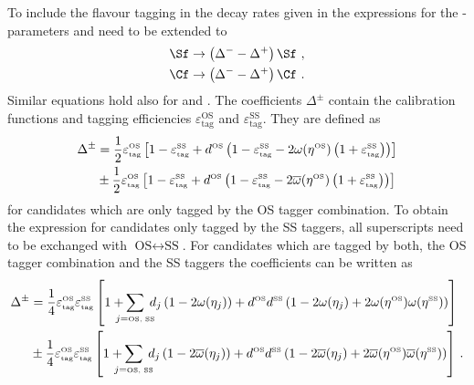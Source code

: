 To include the flavour tagging in the decay rates given in  the expressions for the \CP-parameters \Sf and \Cf need to be extended to
\begin{equation}
\begin{aligned}
\Sf&\to\left(\Delta^--\Delta^+\right)\Sf\,\,,\\
\Cf&\to\left(\Delta^--\Delta^+\right)\Cf\,\,.\label{eq:decRateCorrectFT}
\end{aligned}
\end{equation}
Similar equations hold also for \Sfbar and \Cfbar.
The coefficients $\Delta^\pm$ contain the calibration functions and tagging efficiencies $\varepsilon_{\text{tag}}^{\text{OS}}$ and $\varepsilon_{\text{tag}}^{\text{SS}}$.
They are defined as
\begin{align}
\Delta^\pm&=\frac{1}{2}\varepsilon_{\text{\tiny tag}}^{\text{\tiny OS}}\left[1-\varepsilon_{\text{\tiny tag}}^{\text{\tiny SS}}+d^{\text{\tiny OS}}\left(1-\varepsilon_{\text{\tiny tag}}^{\text{\tiny SS}}-2\omega(\eta^{\text{\tiny OS}})\left(1+\varepsilon_{\text{\tiny tag}}^{\text{\tiny SS}}\right)\right)\right]\nonumber\\
&\pm\frac{1}{2}\varepsilon_{\text{\tiny tag}}^{\text{\tiny OS}}\left[1-\varepsilon_{\text{\tiny tag}}^{\text{\tiny SS}}+d^{\text{\tiny OS}}\left(1-\varepsilon_{\text{\tiny tag}}^{\text{\tiny SS}}-2\overline{\omega}(\eta^{\text{\tiny OS}})\left(1+\varepsilon_{\text{\tiny tag}}^{\text{\tiny SS}}\right)\right)\right]
\end{align}
for candidates which are only tagged by the OS tagger combination.
To obtain the expression for candidates only tagged by the SS taggers, all superscripts need to be exchanged with $\text{OS}\leftrightarrow\text{SS}$.
For candidates which are tagged by both, the OS tagger combination and the SS taggers the coefficients can be written as
\begin{align}
\Delta^\pm&=\frac{1}{4}\varepsilon_{\text{\tiny tag}}^{\text{\tiny OS}}\varepsilon_{\text{\tiny tag}}^{\text{\tiny SS}}\left[1+\hspace{-3mm}\sum_{j=\text{\tiny OS, SS}}\hspace{-2mm}d_j\left(1-2\omega(\eta_j)\right)+d^{\text{\tiny OS}}d^{\text{\tiny SS}}\left(1-2\omega(\eta_j)+2\omega(\eta^{\text{\tiny OS}})\omega(\eta^{\text{\tiny SS}})\right)\right]\nonumber\\
&\pm\frac{1}{4}\varepsilon_{\text{\tiny tag}}^{\text{\tiny OS}}\varepsilon_{\text{\tiny tag}}^{\text{\tiny SS}}\left[1+\hspace{-3mm}\sum_{j=\text{\tiny OS, SS}}\hspace{-2mm}d_j\left(1-2\overline{\omega}(\eta_j)\right)+d^{\text{\tiny OS}}d^{\text{\tiny SS}}\left(1-2\overline{\omega}(\eta_j)+2\overline{\omega}(\eta^{\text{\tiny OS}})\overline{\omega}(\eta^{\text{\tiny SS}})\right)\right]\,.
\end{align}

